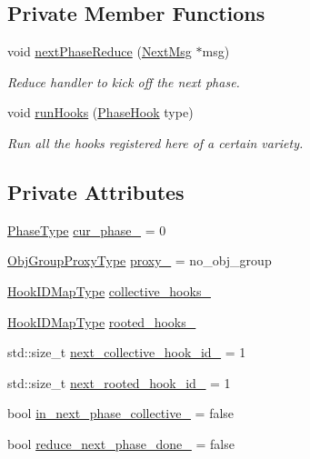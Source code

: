 \subsection*{Private Member Functions}
\begin{DoxyCompactItemize}
\item 
void \hyperlink{structvt_1_1phase_1_1_phase_manager_a59345a6496fb1413de1a1899fe4532cf}{next\+Phase\+Reduce} (\hyperlink{structvt_1_1phase_1_1_next_msg}{Next\+Msg} $\ast$msg)
\begin{DoxyCompactList}\small\item\em Reduce handler to kick off the next phase. \end{DoxyCompactList}\item 
void \hyperlink{structvt_1_1phase_1_1_phase_manager_aeeb5b14ac179b2400a52914208bbd922}{run\+Hooks} (\hyperlink{namespacevt_1_1phase_aec9a63fdd99680d7a7fe99d321193811}{Phase\+Hook} type)
\begin{DoxyCompactList}\small\item\em Run all the hooks registered here of a certain variety. \end{DoxyCompactList}\end{DoxyCompactItemize}
\subsection*{Private Attributes}
\begin{DoxyCompactItemize}
\item 
\hyperlink{namespacevt_a46ce6733d5cdbd735d561b7b4029f6d7}{Phase\+Type} \hyperlink{structvt_1_1phase_1_1_phase_manager_a481f6b2da9da107b31d6ce8d970c7aff}{cur\+\_\+phase\+\_\+} = 0
\item 
\hyperlink{namespacevt_ad7cae989df485fccca57f0792a880a8e}{Obj\+Group\+Proxy\+Type} \hyperlink{structvt_1_1phase_1_1_phase_manager_a119ac185c79c50761d7e8c3f68b751e7}{proxy\+\_\+} = no\+\_\+obj\+\_\+group
\item 
\hyperlink{structvt_1_1phase_1_1_phase_manager_a7f9784fa7550beaa1e7d59e639169a8b}{Hook\+I\+D\+Map\+Type} \hyperlink{structvt_1_1phase_1_1_phase_manager_aafc873771fb849243f082cba71f36672}{collective\+\_\+hooks\+\_\+}
\item 
\hyperlink{structvt_1_1phase_1_1_phase_manager_a7f9784fa7550beaa1e7d59e639169a8b}{Hook\+I\+D\+Map\+Type} \hyperlink{structvt_1_1phase_1_1_phase_manager_a6a2b1be3c11f4fc91bfb84cc2c47c545}{rooted\+\_\+hooks\+\_\+}
\item 
std\+::size\+\_\+t \hyperlink{structvt_1_1phase_1_1_phase_manager_a4270d82b84c02d60c16521d4c5972657}{next\+\_\+collective\+\_\+hook\+\_\+id\+\_\+} = 1
\item 
std\+::size\+\_\+t \hyperlink{structvt_1_1phase_1_1_phase_manager_a22a3945b22c96b581a1aa1cdadd149e4}{next\+\_\+rooted\+\_\+hook\+\_\+id\+\_\+} = 1
\item 
bool \hyperlink{structvt_1_1phase_1_1_phase_manager_ac57c867b3d30923a0241ef462a275f5c}{in\+\_\+next\+\_\+phase\+\_\+collective\+\_\+} = false
\item 
bool \hyperlink{structvt_1_1phase_1_1_phase_manager_a28428326d10fe9485d3da07e8650d352}{reduce\+\_\+next\+\_\+phase\+\_\+done\+\_\+} = false
\end{DoxyCompactItemize}
